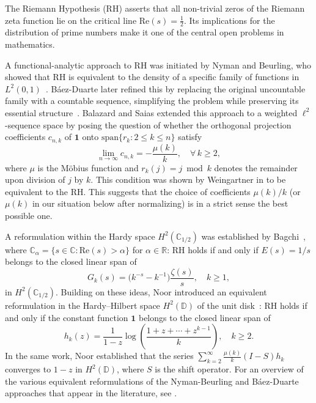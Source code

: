 \documentclass[11pt]{extarticle}
\numberwithin{equation}{section}
\theoremstyle{plain}
\theoremstyle{definition}
\begin{document}
The Riemann Hypothesis (RH) asserts that all non-trivial zeros of the Riemann 
zeta function lie on the critical line $\mathrm{Re}(s) = \frac{1}{2}$. Its 
implications for the distribution of prime numbers make it one of the central 
open problems in mathematics.

A functional-analytic approach to RH was initiated by Nyman and Beurling, who 
showed that RH is equivalent to the density of a specific family of functions 
in $L^2(0,1)$~\cite{beurling,Nyman}. Báez-Duarte later refined this by 
replacing the original uncountable family with a countable sequence, simplifying 
the problem while preserving its essential structure~\cite{baez}. Balazard and 
Saias extended this approach to a weighted $\ell^2$-sequence space by posing the question of whether the orthogonal projection coefficients $c_{n,k}$ of $\mathbf{1}$ onto $\mathrm{span}\{r_k : 
2 \leq k \leq n\}$ satisfy
\[
\lim_{n\to\infty} c_{n,k} = -\frac{\mu(k)}{k}, \quad \forall\, k \geq 2,
\]
where $\mu$ is the Möbius function and $r_k(j) = j \bmod k$ denotes the 
remainder upon division of $j$ by $k$. This condition was shown by Weingartner in \cite{Weingartner} 
to be equivalent to the RH. This suggests that the choice of coefficients $\mu(k)/k$ (or $\mu(k)$ in our situation below after normalizing) is in a strict sense the best possible one.

A reformulation within the Hardy space $H^2(\mathbb{C}_{1/2})$ was established 
by Bagchi~\cite{bagchi}, where $\mathbb{C}_\alpha = \{s \in \mathbb{C} : \mathrm{Re}(s) > \alpha\}$ 
for $\alpha \in \mathbb{R}$: RH holds if and only if $E(s) = 1/s$ belongs to the 
closed linear span of
\[
G_k(s) = \bigl(k^{-s} - k^{-1}\bigr)\frac{\zeta(s)}{s}, \quad k \geq 1,
\]
in $H^2(\mathbb{C}_{1/2})$. Building on these ideas, Noor introduced an 
equivalent reformulation in the Hardy--Hilbert space $H^2(\mathbb{D})$ of the 
unit disk~\cite{waleed1}: RH holds if and only if the constant function 
$\mathbf{1}$ belongs to the closed linear span of
\[
h_k(z) = \frac{1}{1-z}\log\!\left(\frac{1+z+\cdots+z^{k-1}}{k}\right), \quad k \geq 2.
\]
In the same work, Noor established that the series $\sum_{k=2}^{\infty} 
\frac{\mu(k)}{k}(I-S)h_k$ converges to $1-z$ in $H^2(\mathbb{D})$, where 
$S$ is the shift operator. For an overview of the various equivalent reformulations of the Nyman-Beurling and Báez-Duarte approaches that appear in the literature, see \cite[p. 5-6]{noor-charles}.
\end{document}
